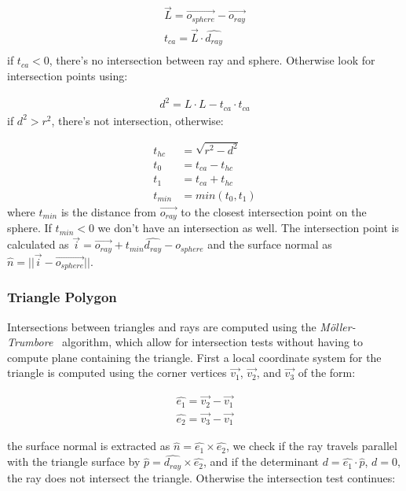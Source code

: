 \documentclass[a4paper, twocolumn]{article}
\begin{document}
        \begin{align*}
            \vec{L} = \vec{o_{sphere}} - \vec{o_{ray}} \\
            t_{ca} = \vec{L} \cdot  \hat{d_{ray}} \\
        \end{align*}
        if \(t_{ca} < 0\), there's no intersection between ray and sphere. Otherwise look for intersection points using:
        
        \begin{align*}
            d^2 = L \cdot L - t_{ca} \cdot t_{ca}
        \end{align*}
        if \(d^2 > r^2\), there's not intersection, otherwise:

        \begin{align*}
            t_{hc} &= \sqrt{r^2 - d^2} \\
            t_0 &= t_{ca} - t_{hc} \\
            t_1 &= t_{ca} + t_{hc} \\
            t_{min} &= min(t_0, t_1)
        \end{align*}
        where \(t_{min}\) is the distance from \(\vec{o_{ray}}\) to the closest intersection point on the sphere. If \(t_{min}  < 0\) we don't have an intersection as well. The intersection point is calculated as  \(\vec{i} = \vec{o_{ray}} + t_{min} \hat{d_{ray}} - o_{sphere} \) and the surface normal as \( \hat{n} = || \vec{i} - \vec{o_{sphere}} || \).

        \subsubsection{Triangle Polygon} \label{sec:triangle_polygon}
        
        Intersections between triangles and rays are computed using the \textit{Möller-Trumbore}~\cite{moller2005fast} algorithm, which allow for intersection tests without having to compute plane containing the triangle. First a local coordinate system for the triangle is computed using the corner vertices \(\vec{v_1}\), \(\vec{v_2}\), and \(\vec{v_3}\) of the form:

\begin{align*}
    \hat{e_1} = \vec{v_2} - \vec{v_1} \\
    \hat{e_2} = \vec{v_3} - \vec{v_1}
\end{align*}

the surface normal is extracted as \( \hat{n} =\hat{e_1} \times \hat{e_2} \), we check if the ray travels parallel with the triangle surface by \(\hat{p} = \hat{d_{ray}} \times \hat{e_2}\), and if the determinant  \(d = \hat{e_1} \cdot \hat{p}\), \(d = 0 \), the ray does not intersect the triangle. Otherwise the intersection test continues:
\end{document}
